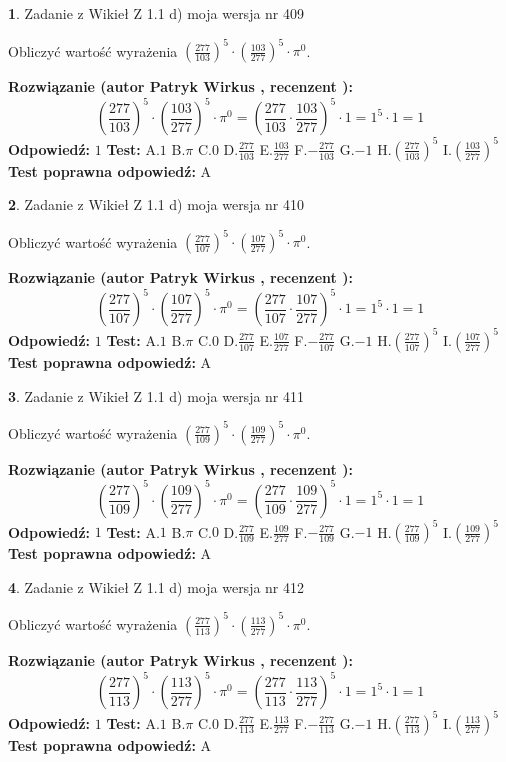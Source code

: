 \documentclass[12pt, a4paper]{article}
\theoremstyle{definition} %
\newtheorem{zad}{}
\newcommand{\zadStart}[1]{\begin{zad}#1\newline}
\newcommand{\zadStop}{\end{zad}}
\newcommand{\rozwStart}[2]{\noindent \textbf{Rozwiązanie (autor #1 , recenzent #2): }\newline}
\newcommand{\rozwStop}{\newline}
\newcommand{\odpStart}{\noindent \textbf{Odpowiedź:}\newline}
\newcommand{\odpStop}{\newline}
\newcommand{\testStart}{\noindent \textbf{Test:}\newline}
\newcommand{\testStop}{\newline}
\newcommand{\kluczStart}{\noindent \textbf{Test poprawna odpowiedź:}\newline}
\newcommand{\kluczStop}{\newline}
\begin{document}
\zadStart{Zadanie z Wikieł Z 1.1 d) moja wersja nr 409}

Obliczyć wartość wyrażenia $(\frac{277}{103})^{5} \cdot (\frac{103}{277})^{5} \cdot \pi^{0}$.
\zadStop
\rozwStart{Patryk Wirkus}{}
$$(\frac{277}{103})^{5} \cdot (\frac{103}{277})^{5} \cdot \pi^{0} = (\frac{277}{103} \cdot \frac{103}{277})^{5} \cdot 1 = 1^{5} \cdot 1 = 1$$
\rozwStop
\odpStart
$1$
\odpStop
\testStart
A.$1$ B.$\pi$ C.$0$ D.$\frac{277}{103}$ E.$\frac{103}{277}$
F.$-\frac{277}{103}$ G.$-1$
H.$(\frac{277}{103})^{5}$
I.$(\frac{103}{277})^{5}$
\testStop
\kluczStart
A
\kluczStop



\zadStart{Zadanie z Wikieł Z 1.1 d) moja wersja nr 410}

Obliczyć wartość wyrażenia $(\frac{277}{107})^{5} \cdot (\frac{107}{277})^{5} \cdot \pi^{0}$.
\zadStop
\rozwStart{Patryk Wirkus}{}
$$(\frac{277}{107})^{5} \cdot (\frac{107}{277})^{5} \cdot \pi^{0} = (\frac{277}{107} \cdot \frac{107}{277})^{5} \cdot 1 = 1^{5} \cdot 1 = 1$$
\rozwStop
\odpStart
$1$
\odpStop
\testStart
A.$1$ B.$\pi$ C.$0$ D.$\frac{277}{107}$ E.$\frac{107}{277}$
F.$-\frac{277}{107}$ G.$-1$
H.$(\frac{277}{107})^{5}$
I.$(\frac{107}{277})^{5}$
\testStop
\kluczStart
A
\kluczStop



\zadStart{Zadanie z Wikieł Z 1.1 d) moja wersja nr 411}

Obliczyć wartość wyrażenia $(\frac{277}{109})^{5} \cdot (\frac{109}{277})^{5} \cdot \pi^{0}$.
\zadStop
\rozwStart{Patryk Wirkus}{}
$$(\frac{277}{109})^{5} \cdot (\frac{109}{277})^{5} \cdot \pi^{0} = (\frac{277}{109} \cdot \frac{109}{277})^{5} \cdot 1 = 1^{5} \cdot 1 = 1$$
\rozwStop
\odpStart
$1$
\odpStop
\testStart
A.$1$ B.$\pi$ C.$0$ D.$\frac{277}{109}$ E.$\frac{109}{277}$
F.$-\frac{277}{109}$ G.$-1$
H.$(\frac{277}{109})^{5}$
I.$(\frac{109}{277})^{5}$
\testStop
\kluczStart
A
\kluczStop



\zadStart{Zadanie z Wikieł Z 1.1 d) moja wersja nr 412}

Obliczyć wartość wyrażenia $(\frac{277}{113})^{5} \cdot (\frac{113}{277})^{5} \cdot \pi^{0}$.
\zadStop
\rozwStart{Patryk Wirkus}{}
$$(\frac{277}{113})^{5} \cdot (\frac{113}{277})^{5} \cdot \pi^{0} = (\frac{277}{113} \cdot \frac{113}{277})^{5} \cdot 1 = 1^{5} \cdot 1 = 1$$
\rozwStop
\odpStart
$1$
\odpStop
\testStart
A.$1$ B.$\pi$ C.$0$ D.$\frac{277}{113}$ E.$\frac{113}{277}$
F.$-\frac{277}{113}$ G.$-1$
H.$(\frac{277}{113})^{5}$
I.$(\frac{113}{277})^{5}$
\testStop
\kluczStart
A
\kluczStop
\end{document}
